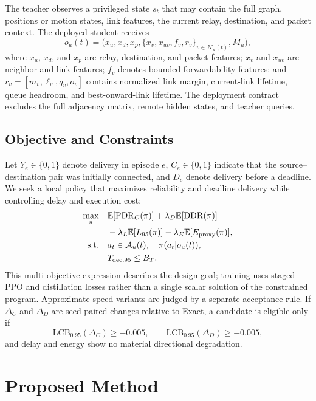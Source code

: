 \documentclass{ieeeaccess}
\newcommand{\pdr}{\mathrm{PDR}}
\newcommand{\E}{\mathbb{E}}
\begin{document}
The teacher observes a privileged state $s_t$ that may contain the full graph, positions or motion states, link features, the current relay, destination, and packet context. The deployed student receives
\begin{equation}
o_u(t)=\big(x_u, x_d, x_p, \{x_v,x_{uv},f_v,r_v\}_{v\in\mathcal{N}_u(t)},M_u\big),
\end{equation}
where $x_u$, $x_d$, and $x_p$ are relay, destination, and packet features; $x_v$ and $x_{uv}$ are neighbor and link features; $f_v$ denotes bounded forwardability features; and $r_v=[m_v,\ell_v,q_v,o_v]$ contains normalized link margin, current-link lifetime, queue headroom, and best-onward-link lifetime. The deployment contract excludes the full adjacency matrix, remote hidden states, and teacher queries.

\subsection{Objective and Constraints}

Let $Y_e\in\{0,1\}$ denote delivery in episode $e$, $C_e\in\{0,1\}$ indicate that the source--destination pair was initially connected, and $D_e$ denote delivery before a deadline. We seek a local policy that maximizes reliability and deadline delivery while controlling delay and execution cost:
\begin{align}
\max_{\pi} \quad
& \E[\pdr_C(\pi)] + \lambda_D\E[\mathrm{DDR}(\pi)] \notag\\
& {}-\lambda_L\E[L_{95}(\pi)]-\lambda_E\E[E_{\mathrm{proxy}}(\pi)],\\
\text{s.t.}\quad
& a_t\in\mathcal{A}_u(t),\quad \pi(a_t|o_u(t)), \notag\\
& T_{\mathrm{dec},95}\leq B_T.
\end{align}
This multi-objective expression describes the design goal; training uses staged PPO and distillation losses rather than a single scalar solution of the constrained program. Approximate speed variants are judged by a separate acceptance rule. If $\Delta_C$ and $\Delta_D$ are seed-paired changes relative to Exact, a candidate is eligible only if
\begin{equation}
\mathrm{LCB}_{0.95}(\Delta_C)\geq-0.005,\qquad
\mathrm{LCB}_{0.95}(\Delta_D)\geq-0.005,
\label{eq:gate}
\end{equation}
and delay and energy show no material directional degradation.

\section{Proposed Method}
\end{document}
